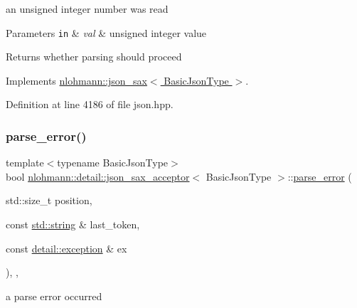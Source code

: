 an unsigned integer number was read 


\begin{DoxyParams}[1]{Parameters}
\mbox{\tt in}  & {\em val} & unsigned integer value \\
\hline
\end{DoxyParams}
\begin{DoxyReturn}{Returns}
whether parsing should proceed 
\end{DoxyReturn}


Implements \hyperlink{structnlohmann_1_1json__sax_ad9b253083e0509923ba195136f49face}{nlohmann\+::json\+\_\+sax$<$ Basic\+Json\+Type $>$}.



Definition at line 4186 of file json.\+hpp.

\mbox{\label{classnlohmann_1_1detail_1_1json__sax__acceptor_afd1b2e566b6b5911131f68054e619829}} 
\subsubsection{\texorpdfstring{parse\+\_\+error()}{parse\_error()}}
{\footnotesize\ttfamily template$<$typename Basic\+Json\+Type$>$ \\
bool \hyperlink{classnlohmann_1_1detail_1_1json__sax__acceptor}{nlohmann\+::detail\+::json\+\_\+sax\+\_\+acceptor}$<$ Basic\+Json\+Type $>$\+::\hyperlink{classnlohmann_1_1detail_1_1parse__error}{parse\+\_\+error} (\begin{DoxyParamCaption}\item[{std\+::size\+\_\+t}]{position,  }\item[{const \hyperlink{namespacenlohmann_1_1detail_a1ed8fc6239da25abcaf681d30ace4985ab45cffe084dd3d20d928bee85e7b0f21}{std\+::string} \&}]{last\+\_\+token,  }\item[{const \hyperlink{classnlohmann_1_1detail_1_1exception}{detail\+::exception} \&}]{ex }\end{DoxyParamCaption})\hspace{0.3cm}{\ttfamily [inline]}, {\ttfamily [override]}, {\ttfamily [virtual]}}



a parse error occurred 


